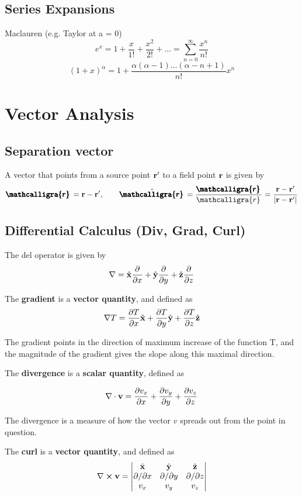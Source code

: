 \documentclass{article}
\newcommand{\vh}[1]{\hat{\vb{#1}}}
\newcommand{\scriptr}{\mathcalligra{r}\,}
\newcommand{\boldscriptr}{\pmb{\mathcalligra{r}}\,}
\begin{document}
\subsection{Series Expansions}
Maclauren (e.g. Taylor at a = 0)
$$
e^{x} = 1 + \frac{x}{1!} + \frac{x^2}{2!} + \dots = \sum_{n=0}^{\infty} \frac{x^n}{n!}
$$
$$
(1+x)^\alpha = 1 + \frac{\alpha(\alpha - 1) \dots (\alpha - n + 1)}{n!}x^{n}
$$

\section{Vector Analysis}
\subsection{Separation vector}
A vector that points from a source point $\vb{r}'$ to a field point $\vb{r}$ is given by 
$$
\boldscriptr = \vb{r} - \vb{r'}, \qquad \hat{\boldscriptr} = \frac{\boldscriptr}{\scriptr} = \frac{\vb{r} - \vb{r'}}{\abs{\vb{r} - \vb{r'}}}
$$

\subsection{Differential Calculus (Div, Grad, Curl)}
The del operator is given by 
$$
\nabla = \vh{x} \frac{\partial}{\partial x} + \vh{y} \frac{\partial}{\partial y} + \vh{z} \frac{\partial}{\partial z}
$$


The \textbf{gradient} is a \textbf{vector quantity}, and defined as 
$$
\nabla T = \frac{\partial T}{\partial x} \vh{x} + \frac{\partial T}{\partial y} \vh{y} + \frac{\partial T}{\partial z} \vh{z}
$$

The gradient points in the direction of maximum increase of the function T, and the magnitude of the gradient gives the slope along this maximal direction.

The \textbf{divergence} is a \textbf{scalar quantity}, defined as

$$
\nabla \cdot \vb{v} = \frac{\partial v_x}{\partial x} + \frac{\partial v_y}{\partial y} + \frac{\partial v_z}{\partial z}
$$

The divergence is a measure of how the vector $v$ spreads out from the point in question.

The \textbf{curl} is a \textbf{vector quantity}, and defined as 
$$
\nabla \cross \vb{v}  = \left| \begin{matrix} 
    \vh{x} & \vh{y} & \vh{z} \\
    \partial / \partial x & \partial / \partial y & \partial / \partial z \\
    v_x & v_y & v_z 
  \end{matrix} \right|
$$
\end{document}
